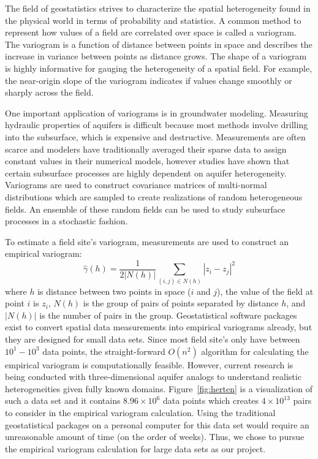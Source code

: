 

The field of geostatistics strives to characterize the spatial heterogeneity found in the physical world in terms of probability and statistics. A common method to represent how values of a field are correlated over space is called a variogram. The variogram is a function of distance between points in space and describes the increase in variance between points as distance grows. The shape of a variogram is highly informative for gauging the heterogeneity of a spatial field. For example, the near-origin slope of the variogram indicates if values change smoothly or sharply across the field. 

One important application of variograms is in groundwater modeling. Measuring hydraulic properties of aquifers is difficult because most methods involve drilling into the subsurface, which is expensive and destructive. Measurements are often scarce and modelers have traditionally averaged their sparse data to assign constant values in their numerical models, however studies have shown that certain subsurface processes are highly dependent on aquifer heterogeneity. Variograms are used to construct covariance matrices of multi-normal distributions which are sampled to create realizations of random heterogeneous fields. An ensemble of these random fields can be used to study subsurface processes in a stochastic fashion.      

To estimate a field site's variogram, measurements are used to construct an empirical variogram: 
\begin{equation}
\hat{\gamma}(h)=\frac{1}{2|N(h)|}\sum_{(i,j)\in N(h)} |z_i-z_j|^2
\end{equation}
where $h$ is distance between two points in space ($i$ and $j$), the value of the field at point $i$ is $z_i$, $N(h)$ is the group of pairs of points separated by distance $h$, and $|N(h)|$ is the number of pairs in the group. Geostatistical software packages exist to convert spatial data measurements into empirical variograms already, but they are designed for small data sets. Since most field site's only have between $10^1 - 10^3$ data points, the straight-forward $O(n^2)$ algorithm for calculating the empirical variogram is computationally feasible. However, current research is being conducted with three-dimensional aquifer analogs to understand realistic heterogeneities given fully known domains. Figure~\ref{fig:herten} is a visualization of such a data set and it contains $8.96\times 10^6$ data points which creates $4\times 10^13$ pairs to consider in the empirical variogram calculation. Using the traditional geostatistical packages on a personal computer for this data set would require an unreasonable amount of time (on the order of weeks). Thus, we chose to pursue the empirical variogram calculation for large data sets as our project.   

